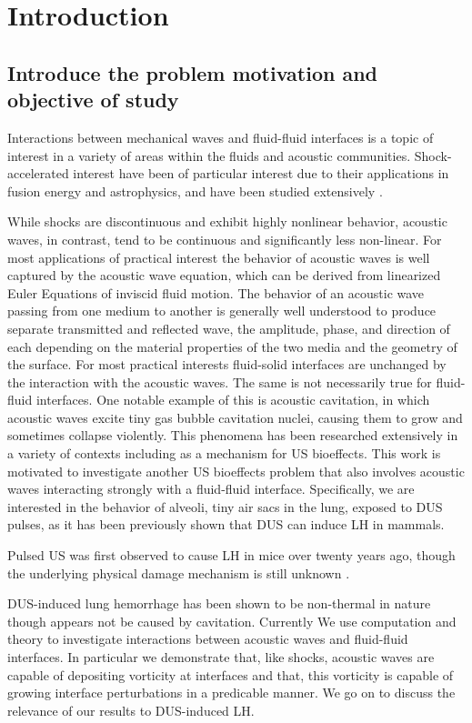 \section{Introduction}
\label{sec:usbe_lung_introduction}
\subsection{Introduce the problem motivation and objective of study}
Interactions between mechanical waves and fluid-fluid interfaces is a
topic of interest in a variety of areas within the fluids and acoustic
communities. Shock-accelerated interest have been of particular
interest due to their applications in fusion energy and astrophysics,
and have been studied extensively \citep{Drake2005}.

While shocks are discontinuous and exhibit highly nonlinear behavior,
acoustic waves, in contrast, tend to be continuous and significantly
less non-linear. For most applications of practical interest the
behavior of acoustic waves is well captured by the acoustic wave
equation, which can be derived from linearized Euler Equations of
inviscid fluid motion. The behavior of an acoustic wave passing from
one medium to another is generally well understood to produce separate
transmitted and reflected wave, the amplitude, phase, and direction of
each depending on the material properties of the two media and the
geometry of the surface. For most practical interests fluid-solid
interfaces are unchanged by the interaction with the acoustic
waves. The same is not necessarily true for fluid-fluid
interfaces. One notable example of this is acoustic cavitation, in
which acoustic waves excite tiny gas bubble cavitation nuclei, causing
them to grow and sometimes collapse violently. This phenomena has been
researched extensively in a variety of contexts including as a
mechanism for \ac{US} bioeffects. This work is motivated to
investigate another \ac{US} bioeffects problem that also involves
acoustic waves interacting strongly with a fluid-fluid
interface. Specifically, we are interested in the behavior of alveoli,
tiny air sacs in the lung, exposed to \ac{DUS} pulses, as it has been
previously shown that \ac{DUS} can induce \ac{LH} in mammals.

Pulsed \ac{US} was first observed to cause \ac{LH} in mice over twenty
years ago, though the underlying physical damage mechanism is still
unknown \citep{Dalecki2004,OBrien2007}.

DUS-induced lung hemorrhage has been shown to be non-thermal in nature
\citep{Dalecki2004} though appears not be caused by
cavitation. Currently We use computation and theory to investigate
interactions between acoustic waves and fluid-fluid interfaces. In
particular we demonstrate that, like shocks, acoustic waves are
capable of depositing vorticity at interfaces and that, this vorticity
is capable of growing interface perturbations in a predicable
manner. We go on to discuss the relevance of our results to
DUS-induced \ac{LH}.


